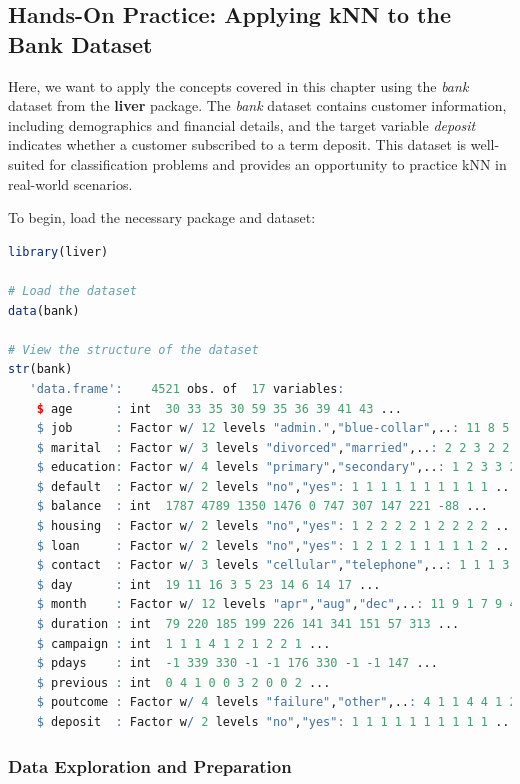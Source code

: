 \documentclass[
  11pt,
]{book}
\theoremstyle{definition}
\theoremstyle{definition}
\theoremstyle{definition}
\theoremstyle{definition}
\theoremstyle{remark}
\begin{document}
\subsection*{Hands-On Practice: Applying kNN to the Bank Dataset}\label{hands-on-practice-applying-knn-to-the-bank-dataset}


Here, we want to apply the concepts covered in this chapter using the \emph{bank} dataset from the \textbf{liver} package. The \emph{bank} dataset contains customer information, including demographics and financial details, and the target variable \emph{deposit} indicates whether a customer subscribed to a term deposit. This dataset is well-suited for classification problems and provides an opportunity to practice kNN in real-world scenarios.

To begin, load the necessary package and dataset:

\begin{lstlisting}[language=R]
library(liver)

# Load the dataset
data(bank)

# View the structure of the dataset
str(bank)
   'data.frame':    4521 obs. of  17 variables:
    $ age      : int  30 33 35 30 59 35 36 39 41 43 ...
    $ job      : Factor w/ 12 levels "admin.","blue-collar",..: 11 8 5 5 2 5 7 10 3 8 ...
    $ marital  : Factor w/ 3 levels "divorced","married",..: 2 2 3 2 2 3 2 2 2 2 ...
    $ education: Factor w/ 4 levels "primary","secondary",..: 1 2 3 3 2 3 3 2 3 1 ...
    $ default  : Factor w/ 2 levels "no","yes": 1 1 1 1 1 1 1 1 1 1 ...
    $ balance  : int  1787 4789 1350 1476 0 747 307 147 221 -88 ...
    $ housing  : Factor w/ 2 levels "no","yes": 1 2 2 2 2 1 2 2 2 2 ...
    $ loan     : Factor w/ 2 levels "no","yes": 1 2 1 2 1 1 1 1 1 2 ...
    $ contact  : Factor w/ 3 levels "cellular","telephone",..: 1 1 1 3 3 1 1 1 3 1 ...
    $ day      : int  19 11 16 3 5 23 14 6 14 17 ...
    $ month    : Factor w/ 12 levels "apr","aug","dec",..: 11 9 1 7 9 4 9 9 9 1 ...
    $ duration : int  79 220 185 199 226 141 341 151 57 313 ...
    $ campaign : int  1 1 1 4 1 2 1 2 2 1 ...
    $ pdays    : int  -1 339 330 -1 -1 176 330 -1 -1 147 ...
    $ previous : int  0 4 1 0 0 3 2 0 0 2 ...
    $ poutcome : Factor w/ 4 levels "failure","other",..: 4 1 1 4 4 1 2 4 4 1 ...
    $ deposit  : Factor w/ 2 levels "no","yes": 1 1 1 1 1 1 1 1 1 1 ...
\end{lstlisting}

\subsubsection*{Data Exploration and Preparation}\label{data-exploration-and-preparation}
\end{document}
